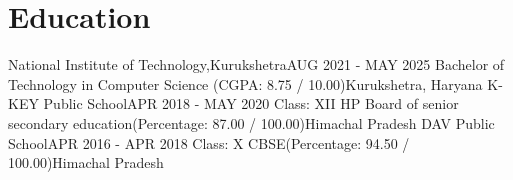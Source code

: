 \section{Education}
    \resumeSubHeadingListStart

    \resumeSubheading
    {National Institute of Technology,Kurukshetra}{AUG 2021 - MAY 2025}
    {Bachelor of Technology in Computer Science (CGPA: 8.75 / 10.00)}{Kurukshetra, Haryana}
    \resumeSubheading
    {K-KEY Public School}{APR 2018 - MAY 2020}
    {Class: XII HP Board of senior secondary education(Percentage: 87.00 / 100.00)}{Himachal Pradesh}
    \resumeSubheading
    {DAV Public School}{APR 2016 - APR 2018}
    {Class: X CBSE(Percentage: 94.50 / 100.00)}{Himachal Pradesh}

    \resumeSubHeadingListEnd
